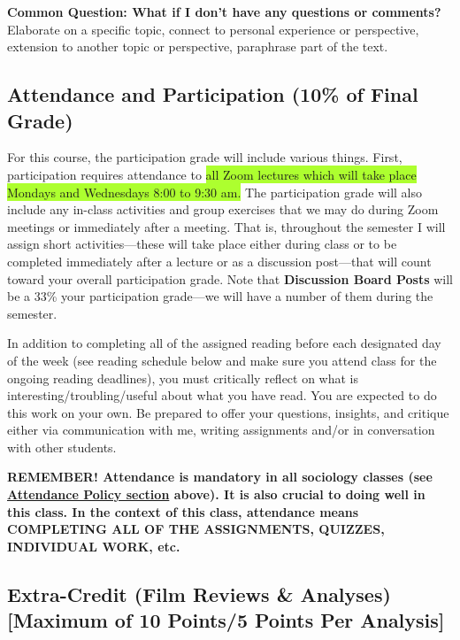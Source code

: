 \documentclass[11pt,]{article}
\begin{document}
\textbf{Common Question: What if I don't have any questions or
comments?} Elaborate on a specific topic, connect to personal experience
or perspective, extension to another topic or perspective, paraphrase
part of the text.

\hypertarget{attendance-and-participation-10-of-final-grade}{%
\subsection{Attendance and Participation (10\% of Final
Grade)}\label{attendance-and-participation-10-of-final-grade}}

For this course, the participation grade will include various things.
First, participation requires attendance to
\colorbox{GreenYellow}{all Zoom lectures which will take place Mondays and Wednesdays 8:00 to 9:30 am.}
The participation grade will also include any in-class activities and
group exercises that we may do during Zoom meetings or immediately after
a meeting. That is, throughout the semester I will assign short
activities---these will take place either during class or to be
completed immediately after a lecture or as a discussion post---that
will count toward your overall participation grade. Note that
\textbf{Discussion Board Posts} will be a 33\% your participation
grade---we will have a number of them during the semester.

In addition to completing all of the assigned reading before each
designated day of the week (see reading schedule below and make sure you
attend class for the ongoing reading deadlines), you must critically
reflect on what is interesting/troubling/useful about what you have
read. You are expected to do this work on your own. Be prepared to offer
your questions, insights, and critique either via communication with me,
writing assignments and/or in conversation with other students.

\textbf{REMEMBER! Attendance is mandatory in all sociology classes (see
\protect\hyperlink{attendance}{Attendance Policy section} above). It is
also crucial to doing well in this class. In the context of this class,
attendance means COMPLETING ALL OF THE ASSIGNMENTS, QUIZZES, INDIVIDUAL
WORK, etc.}

\hypertarget{extra-credit-film-reviews-analyses-maximum-of-10-points5-points-per-analysis}{%
\subsection{Extra-Credit (Film Reviews \& Analyses) {[}Maximum of 10
Points/5 Points Per
Analysis{]}}\label{extra-credit-film-reviews-analyses-maximum-of-10-points5-points-per-analysis}}
\end{document}
